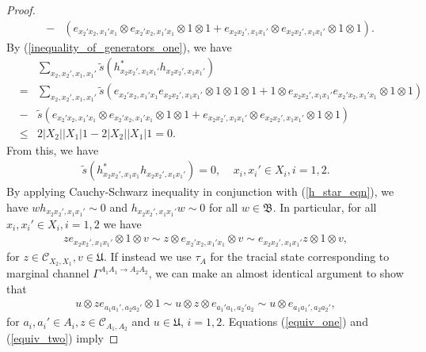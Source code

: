 \documentclass[11pt]{amsart}
\newcommand{\cl}[1]{\mathcal{#1}}
\begin{document}
\begin{proof}
\begin{eqnarray*}
& - &
	 (e_{x_{2}'x_{2}, x_{1}'x_{1}}\otimes e_{x_{2}'x_{2}, x_{1}'x_{1}}\otimes 1 \otimes 1+e_{x_{2}x_{2}', x_{1}x_{1}'}\otimes e_{x_{2}x_{2}', x_{1}x_{1}'}\otimes 1\otimes 1).
\end{eqnarray*}
\noindent By (\ref{inequality_of_generators_one}), we have
\begin{eqnarray*}
& &
	\sum\limits_{x_{2}, x_{2}', x_{1}, x_{1}'}\tilde{s}(h_{x_{2}x_{2}', x_{1}x_{1}'}^{*}h_{x_{2}x_{2}', x_{1}x_{1}'}) \\
& = &
	\sum\limits_{x_{2}, x_{2}', x_{1}, x_{1}'}\tilde{s}(e_{x_{2}'x_{2}, x_{1}'x_{1}}e_{x_{2}x_{2}', x_{1}x_{1}'}\otimes 1 \otimes 1 \otimes 1+1\otimes e_{x_{2}x_{2}', x_{1}x_{1}'}e_{x_{2}'x_{2}, x_{1}'x_{1}}\otimes 1\otimes 1) \\
& - &
	\tilde{s}(e_{x_{2}'x_{2}, x_{1}'x_{1}}\otimes e_{x_{2}'x_{2}, x_{1}'x_{1}}\otimes 1 \otimes 1+e_{x_{2}x_{2}', x_{1}x_{1}'}\otimes e_{x_{2}x_{2}', x_{1}x_{1}'}\otimes 1\otimes 1) \\
& \leq &
	2|X_{2}||X_{1}|1-2|X_{2}||X_{1}|1 = 0.
\end{eqnarray*}
\noindent From this, we have
\begin{gather}\label{h_star_eqn}
	\tilde{s}(h_{x_{2}x_{2}', x_{1}x_{1}}^{*}h_{x_{2}x_{2}', x_{1}x_{1}'}) = 0, \;\;\;\; x_{i}, x_{i}' \in X_{i}, i = 1, 2.
\end{gather}
By applying Cauchy-Schwarz inequality in conjunction with (\ref{h_star_eqn}), we have $wh_{x_{2}x_{2}', x_{1}x_{1}'} \sim 0$ and $h_{x_{2}x_{2}', x_{1}x_{1}'}w\sim 0$ for all $w \in \mathfrak{B}$. In particular, for all $x_{i}, x_{i}' \in X_{i}, i = 1, 2$ we have
\begin{gather}\label{equiv_one}
	ze_{x_{2}x_{2}', x_{1}x_{1}'}\otimes 1 \otimes v \sim z\otimes e_{x_{2}'x_{2}, x_{1}'x_{1}}\otimes v \sim e_{x_{2}x_{2}', x_{1}x_{1}'}z\otimes 1 \otimes v,
\end{gather}
\noindent for $z \in \cl{C}_{X_{2}, X_{1}}, v \in \mathfrak{U}$. If instead we use $\tau_{A}$ for the tracial state corresponding to marginal channel $\Gamma^{A_{1}A_{1}\rightarrow A_{2}A_{2}}$, we can make an almost identical argument to show that
\begin{gather}\label{equiv_two}
	u \otimes ze_{a_{1}a_{1}', a_{2}a_{2}'}\otimes 1 \sim u \otimes z \otimes e_{a_{1}'a_{1}, a_{2}'a_{2}} \sim u\otimes e_{a_{1}a_{1}', a_{2}a_{2}'},
\end{gather}
\noindent for $a_{i}, a_{i}' \in A_{i}, z \in \cl{C}_{A_{1}, A_{2}}$ and $u \in \mathfrak{U}$, $i = 1, 2$. Equations (\ref{equiv_one}) and (\ref{equiv_two}) imply

\end{proof}
\end{document}
